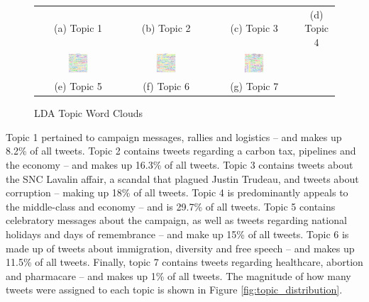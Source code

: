 \begin{figure}[h!]
\begin{tabular}{cccc}
    (a) Topic 1 & (b) Topic 2 & (c) Topic 3 & (d) Topic 4 \\[6pt]
    \includegraphics[width=0.25\textwidth]{Figures/topic_5_wordcloud} &
    \includegraphics[width=0.25\textwidth]{Figures/topic_6_wordcloud} &
    \includegraphics[width=0.25\textwidth]{Figures/topic_7_wordcloud} \\
    (e) Topic 5 & (f) Topic 6 & (g) Topic 7 \\[6pt]
    \end{tabular}
    \caption[LDA Topic Word Clouds]{LDA Topic Word Clouds}
    \label{fig:topic_word_clouds}
\end{figure}

Topic 1 pertained to campaign messages, rallies and logistics – and makes up
8.2\% of all tweets. Topic 2 contains tweets regarding a carbon tax, pipelines
and the economy – and makes up 16.3\% of all tweets. Topic 3 contains tweets
about the SNC Lavalin affair, a scandal that plagued Justin Trudeau, and tweets
about corruption – making up 18\% of all tweets. Topic 4 is predominantly
appeals to the middle-class and economy – and is 29.7\% of all tweets. Topic 5
contains celebratory messages about the campaign, as well as tweets regarding
national holidays and days of remembrance – and make up 15\% of all tweets.
Topic 6 is made up of tweets about immigration, diversity and free speech – and
makes up 11.5\% of all tweets. Finally, topic 7 contains tweets regarding
healthcare, abortion and pharmacare – and makes up 1\% of all tweets. The
magnitude of how many tweets were assigned to each topic is shown in Figure
\ref{fig:topic_distribution}.

